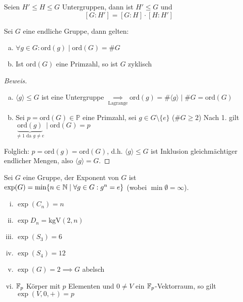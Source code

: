 \documentclass[a4paper]{report}
\begin{document}
\begin{ubng}
Seien $H' \le H \le G$ Untergruppen, dann ist $H' \le G$ und
$$[G: H'] = [G:H]\cdot[H:H']$$
\end{ubng}

\begin{kor} %
  Sei $G$ eine endliche Gruppe, dann gelten:
  \begin{enumerate}[(a)]
    \item $\forall g \in G : \mathrm{ord}(g) \mid \mathrm{ord}(G) = \#G$
    \item Ist $\mathrm{ord}(G)$ eine Primzahl, so ist $G$ zyklisch
  \end{enumerate}
  \begin{proof}[Beweis] \item
    \begin{enumerate}[(a)]
\item $\langle g \rangle \le G$ ist eine Untergruppe $\underset{\text{Lagrange}}\implies \mathrm{ord}(g) = \#\langle g \rangle \mid \#G = \mathrm{ord}(G)$
\item Sei $p = \mathrm{ord}(G) \in \mathbb P$ eine Primzahl, sei $g \in G \setminus \{e\}$ ($\#G \ge 2$)
Nach 1. gilt $\underbrace{\mathrm{ord}(g)}_{\neq 1 \text{ da } g \neq e} \mid \mathrm{ord}(G) = p$
    \end{enumerate}
Folglich: $p = \mathrm{ord}(g) = \mathrm{ord}(G)$, d.h. $\langle g \rangle \le G$ ist Inklusion gleichmächtiger endlicher Mengen, also $\langle g \rangle = G.$
\end{proof}
\end{kor}

\begin{defi}
Sei $G$ eine Gruppe, der Exponent von $G$ ist $\exp(G) = \min \{n \in \Bbb N \mid \forall g \in G : g^{n} = e\}$ (wobei $\min \emptyset = \infty$).
\end{defi}

\begin{bsp*}[Übung] \item
\begin{enumerate}[(i)]
\item $\exp (C_{n}) = n$
\item $\exp D_{n} = \mathrm{kgV}(2,n)$
\item $\exp(S_{3}) = 6$
\item $\exp(S_{4}) = 12$
\item $\exp(G) = 2 \implies G$ abelsch
\item $\Bbb F_{p}$ Körper mit $p$ Elementen und $0 \neq V$ ein $\Bbb F_{p}$-Vektorraum, so gilt $\exp(V, 0, +) = p$
\end{enumerate}
\end{bsp*}
\end{document}
